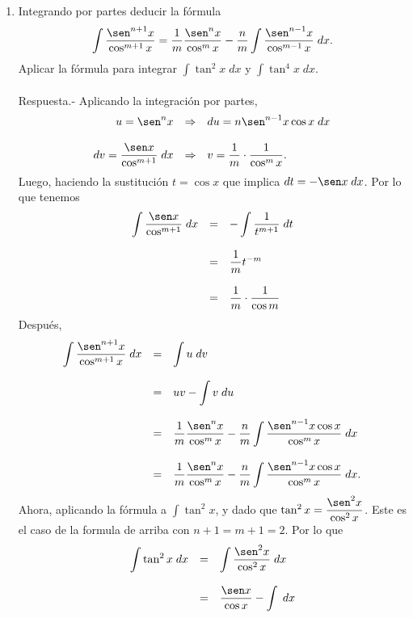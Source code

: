 \begin{enumerate}[\bfseries 1.]
    \item Integrando por partes deducir la fórmula
    $$\int \dfrac{\sen^{n+1}x}{\cos^{m+1}x}=\dfrac{1}{m}\dfrac{\sen^n x}{\cos^m x}-\dfrac{n}{m}\int \dfrac{\sen^{n-1}x}{\cos^{m-1}x}\; dx.$$
    Aplicar la fórmula para integrar $\int \tan^2 x\; dx$ y $\int \tan^4 x \; dx.$\\\\
    	Respuesta.-\; Aplicando la integración por partes,
	$$
	\begin{array}{rcl}
	    u=\sen^n x & \Rightarrow & du=n\sen^{n-1} x\cos x\; dx\\\\
	    dv=\dfrac{\sen x}{\cos^{m+1}}\; dx & \Rightarrow & v=\dfrac{1}{m}\cdot \dfrac{1}{\cos^m x}.
	\end{array}
	$$
	Luego, haciendo la sustitución $t = \cos x$ que implica $dt=-\sen x\; dx$. Por lo que tenemos
	$$
	\begin{array}{rcl}
	    \displaystyle\int \dfrac{\sen x}{\cos^{m+1}}\; dx &=& - \displaystyle\int \dfrac{1}{t^{m+1}}\; dt\\\\
	    &=& \dfrac{1}{m}t^{-m}\\\\
	    &=&\dfrac{1}{m}\cdot \dfrac{1}{\cos m}
	\end{array}
	$$
	Después,
	$$
	\begin{array}{rcl}
	    \displaystyle\int \dfrac{\sen^{n+1}x}{\cos^{m+1}x}\; dx &=& \displaystyle\int u \; dv\\\\
	    &=& uv-\displaystyle\int v\; du\\\\
	    &=& \dfrac{1}{m}\dfrac{\sen^n x}{\cos^m x}-\dfrac{n}{m}\displaystyle \int \dfrac{\sen^{n-1}x\cos x}{\cos^m x}\; dx\\\\
	    &=& \dfrac{1}{m}\dfrac{\sen^n x}{\cos^m x}-\dfrac{n}{m}\displaystyle\int \dfrac{\sen^{n-1}x\cos x}{\cos^m x}\; dx.
	\end{array}
	$$
	Ahora, aplicando la fórmula a $\int \tan^2 x$, y dado que $\tan^2 x = \dfrac{\sen^2 x}{\cos^2 x}$. Este es el caso de la formula de arriba con $n+1=m+1=2.$ Por lo que
	$$
	\begin{array}{rcl}
	    \displaystyle\int \tan^2 x\; dx &=& \displaystyle\int \dfrac{\sen^2 x}{\cos^2 x}\; dx\\\\
	    &=& \dfrac{\sen x}{\cos x}-\displaystyle\int \; dx\\\\

\end{array}$$
\end{enumerate}
